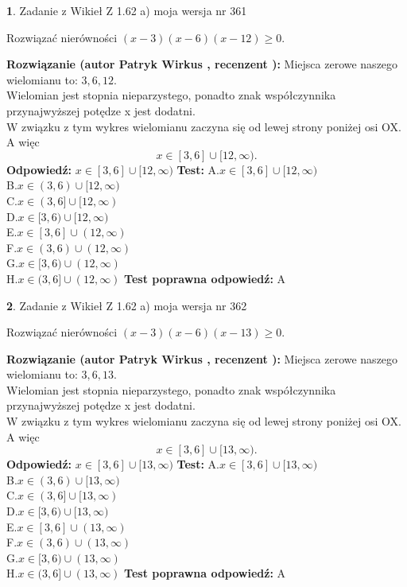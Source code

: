 \documentclass[12pt, a4paper]{article}
\theoremstyle{definition} %
\newtheorem{zad}{}
\newcommand{\zadStart}[1]{\begin{zad}#1\newline}
\newcommand{\zadStop}{\end{zad}}
\newcommand{\rozwStart}[2]{\noindent \textbf{Rozwiązanie (autor #1 , recenzent #2): }\newline}
\newcommand{\rozwStop}{\newline}
\newcommand{\odpStart}{\noindent \textbf{Odpowiedź:}\newline}
\newcommand{\odpStop}{\newline}
\newcommand{\testStart}{\noindent \textbf{Test:}\newline}
\newcommand{\testStop}{\newline}
\newcommand{\kluczStart}{\noindent \textbf{Test poprawna odpowiedź:}\newline}
\newcommand{\kluczStop}{\newline}
\begin{document}
\zadStart{Zadanie z Wikieł Z 1.62 a) moja wersja nr 361}

Rozwiązać nierówności $(x-3)(x-6)(x-12)\ge0$.
\zadStop
\rozwStart{Patryk Wirkus}{}
Miejsca zerowe naszego wielomianu to: $3, 6, 12$.\\
Wielomian jest stopnia nieparzystego, ponadto znak współczynnika przy\linebreak najwyższej potędze x jest dodatni.\\ W związku z tym wykres wielomianu zaczyna się od lewej strony poniżej osi OX. A więc $$x \in [3,6] \cup [12,\infty).$$
\rozwStop
\odpStart
$x \in [3,6] \cup [12,\infty)$
\odpStop
\testStart
A.$x \in [3,6] \cup [12,\infty)$\\
B.$x \in (3,6) \cup [12,\infty)$\\
C.$x \in (3,6] \cup [12,\infty)$\\
D.$x \in [3,6) \cup [12,\infty)$\\
E.$x \in [3,6] \cup (12,\infty)$\\
F.$x \in (3,6) \cup (12,\infty)$\\
G.$x \in [3,6) \cup (12,\infty)$\\
H.$x \in (3,6] \cup (12,\infty)$
\testStop
\kluczStart
A
\kluczStop



\zadStart{Zadanie z Wikieł Z 1.62 a) moja wersja nr 362}

Rozwiązać nierówności $(x-3)(x-6)(x-13)\ge0$.
\zadStop
\rozwStart{Patryk Wirkus}{}
Miejsca zerowe naszego wielomianu to: $3, 6, 13$.\\
Wielomian jest stopnia nieparzystego, ponadto znak współczynnika przy\linebreak najwyższej potędze x jest dodatni.\\ W związku z tym wykres wielomianu zaczyna się od lewej strony poniżej osi OX. A więc $$x \in [3,6] \cup [13,\infty).$$
\rozwStop
\odpStart
$x \in [3,6] \cup [13,\infty)$
\odpStop
\testStart
A.$x \in [3,6] \cup [13,\infty)$\\
B.$x \in (3,6) \cup [13,\infty)$\\
C.$x \in (3,6] \cup [13,\infty)$\\
D.$x \in [3,6) \cup [13,\infty)$\\
E.$x \in [3,6] \cup (13,\infty)$\\
F.$x \in (3,6) \cup (13,\infty)$\\
G.$x \in [3,6) \cup (13,\infty)$\\
H.$x \in (3,6] \cup (13,\infty)$
\testStop
\kluczStart
A
\kluczStop
\end{document}
